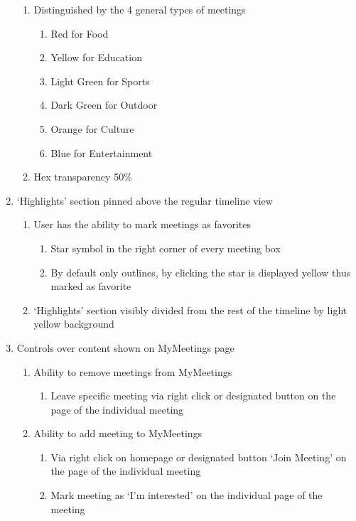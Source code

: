 \documentclass[conference]{IEEEtran}
\begin{document}
\begin{enumerate}
\begin{enumerate}
        \item Distinguished by the 4 general types of meetings
        \begin{enumerate}
            \item Red for Food
            \item Yellow for Education
            \item Light Green for Sports
            \item Dark Green for Outdoor
            \item Orange for Culture
            \item Blue for Entertainment
        \end{enumerate}
        \item Hex transparency 50\%
    \end{enumerate}
    \item ‘Highlights’ section pinned above the regular timeline view
    \begin{enumerate}
        \item User has the ability to mark meetings as favorites
        \begin{enumerate}
            \item Star symbol in the right corner of every meeting box
            \item By default only outlines, by clicking the star is displayed yellow thus marked as favorite
        \end{enumerate}
        \item ‘Highlights’ section visibly divided from the rest of the timeline by light yellow background
    \end{enumerate}
    \item Controls over content shown on MyMeetings page
    \begin{enumerate}
        \item Ability to remove meetings from MyMeetings
        \begin{enumerate}
            \item Leave specific meeting via right click or designated button on the page of the individual meeting
        \end{enumerate}
            \item Ability to add meeting to MyMeetings
        \begin{enumerate}
            \item Via right click on homepage or designated button ‘Join Meeting’ on the page of the individual meeting
            \item Mark meeting as ‘I’m interested’ on the individual page of the meeting

\end{enumerate}
\end{enumerate}
\end{enumerate}
\end{document}
